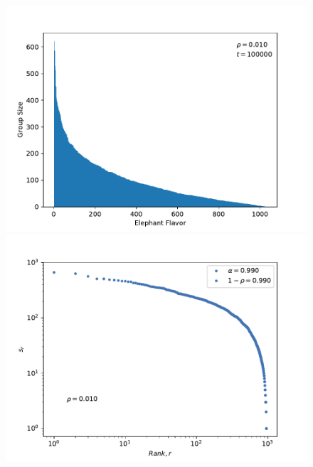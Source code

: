 \documentclass{article}
\begin{document}
\begin{figure}[H]
    \vspace*{0.20cm} %

    \begin{minipage}{0.47\textwidth}
    \includegraphics[width=\linewidth]{Q01/richGetRicherBarChart_rho0d010.pdf}
    \end{minipage}
    \hspace{\fill} %
    \begin{minipage}{0.47\textwidth}
    \includegraphics[width=\linewidth]{Q01/rgr_zipf_rho0d010.pdf}
    \end{minipage}
    
    \vspace*{0.20cm} %
    

\end{figure}
\end{document}
